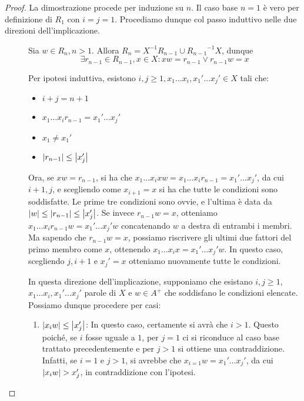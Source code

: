\begin{proof}
  La dimostrazione procede per induzione su \(n\).
  Il caso base \(n=1\) è vero per definizione di \(R_1\) con \(i = j = 1\).
  Procediamo dunque col passo induttivo nelle due direzioni dell'implicazione.
  \begin{description}
    \item[\q{\(\implies\)}] 
      Sia \(w \in R_n, n>1\). Allora \(R_n = X^{-1}R_{n-1} \cup {R_{n-1}}^{-1}X\), dunque
      \[\exists r_{n-1} \in R_{n-1}, x \in X: xw=r_{n-1} \lor r_{n-1}w=x\]

      Per ipotesi induttiva, esistono \(i,j \geq 1, x_1\ldots x_i,x_1'\ldots x_j' \in X\) tali che:
      \begin{itemize}
        \item \(i+j=n+1\)
        \item \(x_1\ldots x_i r_{n-1} = x_1'\ldots x_j'\)
        \item \(x_1 \neq x_1'\)
        \item \(\left|r_{n-1}\right| \leq \left|x_j'\right|\)
      \end{itemize}
      Ora, se \(xw = r_{n-1}\), si ha che \(x_1\ldots x_i xw= x_1\ldots x_i r_{n-1} = x_1'\ldots x_j'\), da cui \(i+1,j\), e scegliendo come \(x_{i+1} = x\) si ha che tutte le condizioni sono soddisfatte.
      Le prime tre condizioni sono ovvie, e l'ultima è data da \(\left|w\right|\leq\left|r_{n-1}\right|\leq\left|x_j'\right|\).
      Se invece \(r_{n-1}w = x\), otteniamo \(x_1\ldots x_i r_{n-1} w = x_1'\ldots x_j' w\) concatenando \(w\) a destra di entrambi i membri.
      Ma sapendo che \(r_{n-1}w = x\), possiamo riscrivere gli ultimi due fattori del primo membro come \(x\), ottenendo \(x_1\ldots x_i x = x_1'\ldots x_j' w\).
      In questo caso, scegliendo \(j,i+1\) e \(x_j' = x\) otteniamo nuovamente tutte le condizioni.
    \item[\q{\(\impliedby\)}]
      In questa direzione dell'implicazione, supponiamo che esistano \(i,j \geq 1\), \(x_1\ldots x_i,x_1'\ldots x_j'\) parole di \(X\) e \(w\in A^+\) che soddisfano le condizioni elencate.
      Possiamo dunque procedere per casi:
      \begin{enumerate}
        \item \(\left|x_{i}w\right| \leq \left|x_j'\right|\):
          In questo caso, certamente si avrà che \(i>1\). Questo poiché, se \(i\) fosse uguale a \(1\), per \(j=1\) ci si riconduce al caso base trattato precedentemente e per \(j>1\) si ottiene una contraddizione.
          Infatti, se \(i=1\) e \(j>1\), si avrebbe che \(x_{i=1} w = x_1'\ldots x_j'\), da cui \(\left|x_{i}w\right| > x_j'\), in contraddizione con l'ipotesi.


\end{enumerate}
\end{description}
\end{proof}
